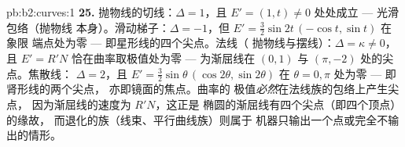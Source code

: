 \begin{solution}{pb:b2:curves:1}
\textbf{25.} 抛物线的切线：$\Delta = 1$，且 $E' =
(1, t) \neq 0$ 处处成立 --- 光滑包络（抛物线
本身）。滑动梯子：$\Delta = -1$，但 $E' =
\tfrac32\sin 2t\,(-\cos t, \sin t)$ 在象限
端点处为零 --- 即星形线的四个尖点。法线（
抛物线与摆线）：$\Delta = \kappa \neq 0$，且
$E' = R'N$ 恰在曲率取极值处为零
--- 为渐屈线在 $(0,1)$ 与 $(\pi, -2)$ 处的尖点。焦散线：
$\Delta = 2$，且 $E' = \tfrac32\sin\theta\,(\cos2\theta,
\sin2\theta)$ 在 $\theta = 0, \pi$ 处为零 --- 即肾形线的两个尖点，
亦即镜面的焦点。曲率的
极值\emph{必然}在法线族的包络上产生尖点，
因为渐屈线的速度为 $R'N$，这正是
椭圆的渐屈线有四个尖点（即四个顶点）的缘故，
而退化的族（线束、平行曲线族）则属于
机器只输出一个点或完全不输出的情形。
\end{solution}
